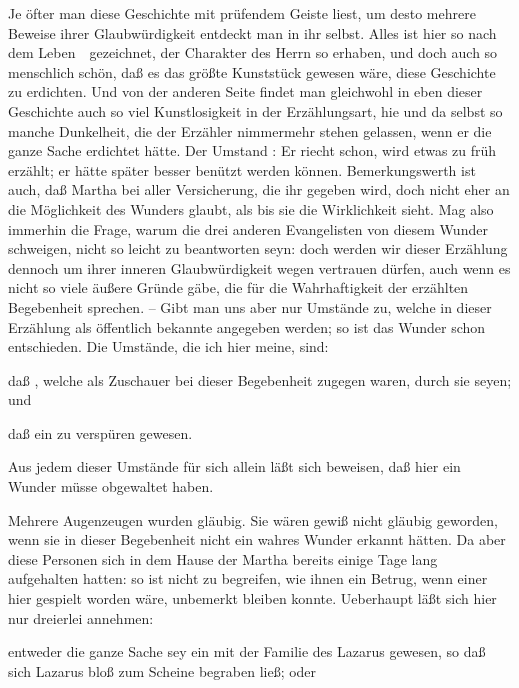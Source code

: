 \begin{aufza}
Je öfter man diese Geschichte mit prüfendem Geiste liest, um desto mehrere Beweise ihrer Glaubwürdigkeit entdeckt man in ihr selbst. Alles ist hier so nach dem Leben~\ gezeichnet, der Charakter des Herrn so erhaben, und doch auch so menschlich schön, daß es das größte Kunststück gewesen wäre, diese Geschichte zu erdichten. Und von der anderen Seite findet man gleichwohl in eben dieser Geschichte auch so viel Kunstlosigkeit in der Erzählungsart, hie und da selbst so manche Dunkelheit, die der Erzähler nimmermehr stehen gelassen, wenn er die ganze Sache erdichtet hätte. Der Umstand \zB : Er riecht schon, wird etwas zu früh erzählt; er hätte später besser benützt werden können. Bemerkungswerth ist auch, daß Martha bei aller Versicherung, die ihr gegeben wird, doch nicht eher an die Möglichkeit des Wunders glaubt, als bis sie die Wirklichkeit sieht. Mag also immerhin die Frage, warum die drei anderen Evangelisten von diesem Wunder schweigen, nicht so leicht zu beantworten seyn: doch werden wir dieser Erzählung dennoch um ihrer inneren Glaubwürdigkeit wegen vertrauen dürfen, auch wenn es nicht so viele äußere Gründe gäbe, die für die Wahrhaftigkeit der erzählten Begebenheit sprechen. -- Gibt man uns aber nur  Umstände zu, welche in dieser Erzählung als öffentlich bekannte angegeben werden; so ist das Wunder schon entschieden. Die Umstände, die ich hier meine, sind:
\begin{aufzb}
\item daß , welche als Zuschauer bei dieser Begebenheit zugegen waren, durch sie  seyen; und
\item daß ein  zu verspüren gewesen.
\end{aufzb}\par
Aus jedem dieser Umstände für sich allein läßt sich beweisen, daß hier ein Wunder müsse obgewaltet haben.
\begin{aufzb}
\item Mehrere Augenzeugen wurden gläubig. Sie wären gewiß nicht gläubig geworden, wenn sie in dieser Begebenheit nicht ein wahres Wunder erkannt hätten. Da aber diese Personen sich in dem Hause der Martha bereits einige Tage lang aufgehalten hatten: so ist nicht zu begreifen, wie ihnen ein Betrug, wenn einer hier gespielt worden wäre, unbemerkt bleiben konnte. Ueberhaupt läßt sich hier nur dreierlei annehmen:
\begin{aufzc}
\item entweder die ganze Sache sey ein mit der Familie des Lazarus  gewesen, so daß sich Lazarus bloß zum Scheine begraben ließ; oder~

\end{aufzc}
\end{aufzb}
\end{aufza}
